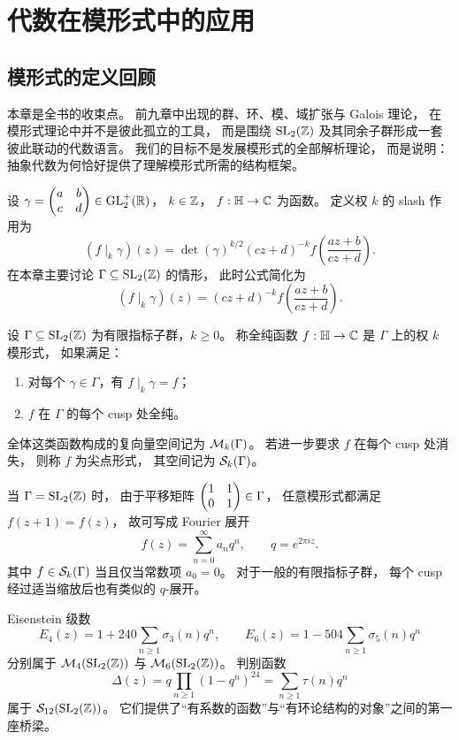 \chapter{代数在模形式中的应用}
\section{模形式的定义回顾}
本章是全书的收束点。 前九章中出现的群、环、模、域扩张与 Galois 理论， 在模形式理论中并不是彼此孤立的工具， 而是围绕 $\mathrm{SL}_2(\mathbb{Z})$ 及其同余子群形成一套彼此联动的代数语言。 我们的目标不是发展模形式的全部解析理论， 而是说明：抽象代数为何恰好提供了理解模形式所需的结构框架。
\begin{definition}
设
$\gamma=\begin{pmatrix} a&b\\ c&d \end{pmatrix}\in \mathrm{GL}_2^+(\mathbb{R})$，
$k\in \mathbb{Z}$，
$f:\mathbb{H}\to\mathbb{C}$ 为函数。
定义权 $k$ 的 slash 作用为
\[ (f\mid_k \gamma)(z)=\det(\gamma)^{k/2}(cz+d)^{-k}f\!\left(\frac{az+b}{cz+d}\right). \]
在本章主要讨论 $\Gamma\subseteq \mathrm{SL}_2(\mathbb{Z})$ 的情形，
此时公式简化为
\[ (f\mid_k \gamma)(z)=(cz+d)^{-k}f\!\left(\frac{az+b}{cz+d}\right). \]
\end{definition}
\begin{definition}
设 $\Gamma\subseteq \mathrm{SL}_2(\mathbb{Z})$ 为有限指标子群，$k\ge 0$。
称全纯函数 $f:\mathbb{H}\to\mathbb{C}$ 是 $\Gamma$ 上的权 $k$ 模形式，
如果满足：
\begin{enumerate}[label=(\roman*), leftmargin=*]
\item 对每个 $\gamma\in \Gamma$，有 $f\mid_k\gamma=f$；
\item $f$ 在 $\Gamma$ 的每个 cusp 处全纯。
\end{enumerate}
全体这类函数构成的复向量空间记为 $\mathcal{M}_k(\Gamma)$。
若进一步要求 $f$ 在每个 cusp 处消失，
则称 $f$ 为尖点形式，
其空间记为 $\mathcal{S}_k(\Gamma)$。
\end{definition}
当 $\Gamma=\mathrm{SL}_2(\mathbb{Z})$ 时，
由于平移矩阵 $\begin{pmatrix} 1&1\\0&1 \end{pmatrix}\in\Gamma$，
任意模形式都满足 $f(z+1)=f(z)$，
故可写成 Fourier 展开
\[ f(z)=\sum_{n=0}^{\infty} a_n q^n, \qquad q=e^{2\pi i z}. \]
其中 $f\in \mathcal{S}_k(\Gamma)$ 当且仅当常数项 $a_0=0$。
对于一般的有限指标子群，
每个 cusp 经过适当缩放后也有类似的 $q$-展开。
\begin{example}
Eisenstein 级数
\[ E_4(z)=1+240\sum_{n\ge 1}\sigma_3(n)q^n, \qquad E_6(z)=1-504\sum_{n\ge 1}\sigma_5(n)q^n \]
分别属于 $\mathcal{M}_4(\mathrm{SL}_2(\mathbb{Z}))$ 与 $\mathcal{M}_6(\mathrm{SL}_2(\mathbb{Z}))$。
判别函数
\[ \Delta(z)=q\prod_{n\ge 1}(1-q^n)^{24} =\sum_{n\ge 1}\tau(n)q^n \]
属于 $\mathcal{S}_{12}(\mathrm{SL}_2(\mathbb{Z}))$。
它们提供了“有系数的函数”与“有环论结构的对象”之间的第一座桥梁。
\end{example}
